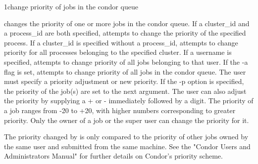 \begin{ManPage}{}{1}{change priority of jobs in the condor queue} 
\label{man-condor-prio}
\Synopsis {}

\Description
{} changes the priority of one or more jobs in the condor queue. If a cluster\_id and a process\_id are both
specified,  attempts to change the priority of the specified process. If a cluster\_id is specified without a
process\_id,  attempts to change priority for all processes belonging to the specified cluster. If a username is
specified,  attempts to change priority of all jobs belonging to that user. If the -a flag is set, 
attempts to change priority of all jobs in the condor queue. The user must specify a priority adjustment or new priority. If the
-p option is specified, the priority of the job(s) are set to the next argument. The user can also adjust the priority by
supplying a + or - immediately followed by a digit. The priority of a job ranges from -20 to +20, with higher numbers
corresponding to greater priority. Only the owner of a job or the super user can change the priority for it. 

The priority changed by  is only compared to the priority of other jobs owned by the same user and submitted
from the same machine. See the "Condor Users and Administrators Manual" for further details on Condor's priority scheme. 

\begin{Options}
\end{Options}

\end{ManPage}

